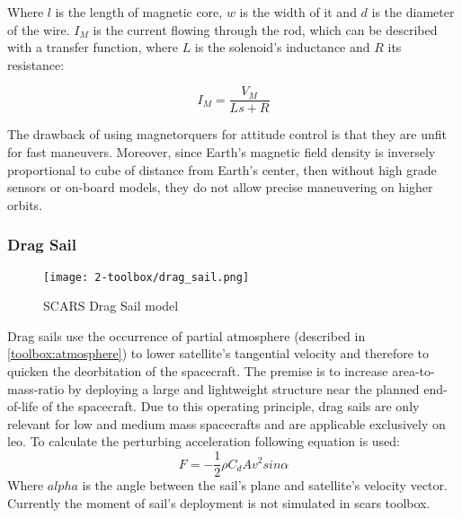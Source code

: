         Where $l$ is the length of magnetic core, $w$ is the width of it and $d$ is the diameter of the wire. $I_M$ is the current flowing through the rod, which can be described with a transfer function, where $L$ is the solenoid's inductance and $R$ its resistance:

        \begin{equation}
            I_M = \frac{V_M}{Ls+R}
        \end{equation}



        The drawback of using magnetorquers for attitude control is that they are unfit for fast maneuvers. Moreover, since Earth's magnetic field density is inversely proportional to cube of distance from Earth's center, then without high grade sensors or on-board models, they do not allow precise maneuvering on higher orbits.


    \subsubsection{Drag Sail}
        \begin{figure}[H]
            \centering
            \texttt{[image: 2-toolbox/drag\_sail.png]}
            \caption{SCARS Drag Sail model}
            \label{fig:drag_sail}
        \end{figure}

        Drag sails use the occurrence of partial atmosphere (described in \ref{toolbox:atmosphere}) to lower satellite's tangential velocity and therefore to quicken the deorbitation of the spacecraft. The premise is to increase area-to-mass-ratio by deploying a large and lightweight structure near the planned end-of-life of the spacecraft. Due to this operating principle, drag sails are only relevant for low and medium mass spacecrafts and are applicable exclusively on \ac{leo}. To calculate the perturbing acceleration following equation is used:
        \begin{equation}
            F = -\frac{1}{2}\rho C_d A v^2sin\alpha
        \end{equation}
        Where $alpha$ is the angle between the sail's plane and satellite's velocity vector. Currently the moment of sail's deployment is not simulated in \ac{scars} toolbox.

